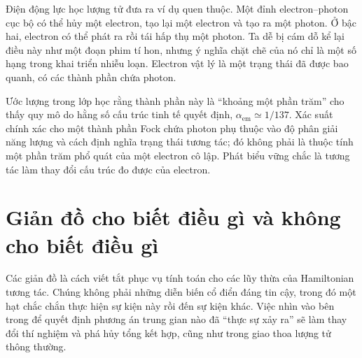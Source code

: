 \begin{classroomqa}\end{classroomqa}

Điện động lực học lượng tử đưa ra ví dụ quen thuộc. Một đỉnh electron--photon cục bộ có thể hủy một electron, tạo lại một electron và tạo ra một photon. Ở bậc hai, electron có thể phát ra rồi tái hấp thụ một photon. Ta dễ bị cám dỗ kể lại điều này như một đoạn phim tí hon, nhưng ý nghĩa chặt chẽ của nó chỉ là một số hạng trong khai triển nhiễu loạn. Electron vật lý là một trạng thái đã được bao quanh, có các thành phần chứa photon.

Ước lượng trong lớp học rằng thành phần này là ``khoảng một phần trăm'' cho thấy quy mô do hằng số cấu trúc tinh tế quyết định, \(\alpha_{\mathrm{em}}\simeq 1/137\). Xác suất chính xác cho một thành phần Fock chứa photon phụ thuộc vào độ phân giải năng lượng và cách định nghĩa trạng thái tương tác; đó không phải là thuộc tính một phần trăm phổ quát của một electron cô lập. Phát biểu vững chắc là tương tác làm thay đổi cấu trúc đo được của electron.

\section{Giản đồ cho biết điều gì và không cho biết điều gì}

Các giản đồ là cách viết tắt phục vụ tính toán cho các lũy thừa của Hamiltonian tương tác. Chúng không phải những diễn biến cổ điển đáng tin cậy, trong đó một hạt chắc chắn thực hiện sự kiện này rồi đến sự kiện khác. Việc nhìn vào bên trong để quyết định phương án trung gian nào đã ``thực sự xảy ra'' sẽ làm thay đổi thí nghiệm và phá hủy tổng kết hợp, cũng như trong giao thoa lượng tử thông thường.

\begin{classroomqa}\end{classroomqa}

